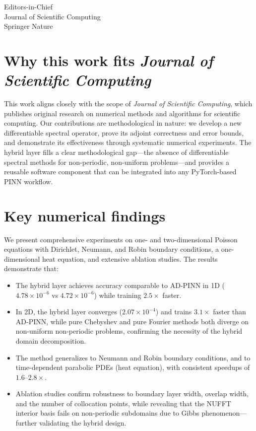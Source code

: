\documentclass[12pt]{letter}
\begin{document}
\begin{letter}{
  Editors-in-Chief\\
  Journal of Scientific Computing\\
  Springer Nature
}
\section*{Why this work fits \textit{Journal of Scientific Computing}}

This work aligns closely with the scope of \textit{Journal of Scientific Computing}, which publishes original research on numerical methods and algorithms for scientific computing. Our contributions are methodological in nature: we develop a new differentiable spectral operator, prove its adjoint correctness and error bounds, and demonstrate its effectiveness through systematic numerical experiments. The hybrid layer fills a clear methodological gap---the absence of differentiable spectral methods for non-periodic, non-uniform problems---and provides a reusable software component that can be integrated into any PyTorch-based PINN workflow.

\section*{Key numerical findings}

We present comprehensive experiments on one- and two-dimensional Poisson equations with Dirichlet, Neumann, and Robin boundary conditions, a one-dimensional heat equation, and extensive ablation studies. The results demonstrate that:

\begin{itemize}
  \item The hybrid layer achieves accuracy comparable to AD-PINN in 1D ($4.78\times10^{-6}$ vs $4.72\times10^{-6}$) while training $2.5\times$ faster.
  \item In 2D, the hybrid layer converges ($2.07\times10^{-4}$) and trains $3.1\times$ faster than AD-PINN, while pure Chebyshev and pure Fourier methods both diverge on non-uniform non-periodic problems, confirming the necessity of the hybrid domain decomposition.
  \item The method generalizes to Neumann and Robin boundary conditions, and to time-dependent parabolic PDEs (heat equation), with consistent speedups of $1.6$--$2.8\times$.
  \item Ablation studies confirm robustness to boundary layer width, overlap width, and the number of collocation points, while revealing that the NUFFT interior basis fails on non-periodic subdomains due to Gibbs phenomenon---further validating the hybrid design.
\end{itemize}


\end{letter}
\end{document}
